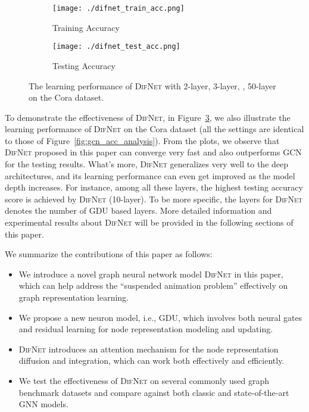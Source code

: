 \documentclass{article}
\newcommand{\our}{\textsc{DifNet}}
\newcommand{\gdu}{\textsc{GDU}}
\newcommand{\gcn}{\textsc{GCN}}
\begin{document}
\begin{figure}
    \centering
    \begin{subfigure}[b]{.23\textwidth}
    	\texttt{[image: ./difnet\_train\_acc.png]}
    	\caption{Training Accuracy}\label{fig:difnet_acc_train}
    \end{subfigure}\hfill
    \begin{subfigure}[b]{.23\textwidth}
    	\texttt{[image: ./difnet\_test\_acc.png]}
    	\caption{Testing Accuracy}\label{fig:difnet_acc_test}
    \end{subfigure}\caption{{The learning performance of {\our} with 2-layer, 3-layer, , 50-layer on the Cora dataset.}}\label{fig:difnet_acc_analysis}
\end{figure}


To demonstrate the effectiveness of {\our}, in Figure~\ref{fig:difnet_acc_analysis}, we also illustrate the learning performance of {\our} on the Cora dataset (all the settings are identical to those of Figure~\ref{fig:gcn_acc_analysis}). From the plots, we observe that {\our} proposed in this paper can converge very fast and also outperforms {\gcn} for the testing results. What's more, {\our} generalizes very well to the deep architectures, and its learning performance can even get improved as the model depth increases. For instance, among all these layers, the highest testing accuracy score is achieved by {\our} (10-layer). To be more specific, the layers for {\our} denotes the number of {\gdu} based layers. More detailed information and experimental results about {\our} will be provided in the following sections of this paper.

We summarize the contributions of this paper as follows:
\begin{itemize}
\item We introduce a novel graph neural network model {\our} in this paper, which can help address the ``suspended animation problem'' effectively on graph representation learning.
\item We propose a new neuron model, i.e., {\gdu}, which involves both neural gates and residual learning for node representation modeling and updating.
\item {\our} introduces an attention mechanism for the node representation diffusion and integration, which can work both effectively and efficiently. 
\item We test the effectiveness of {\our} on several commonly used graph benchmark datasets and compare against both classic and state-of-the-art GNN models.
\end{itemize}
\end{document}
